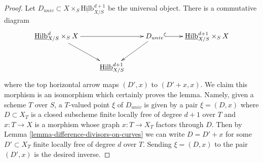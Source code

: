 \documentclass[10pt,a4paper]{amsart}
\theoremstyle{plain}
\theoremstyle{definition}
\theoremstyle{remark}
\numberwithin{equation}{subsection}
\def\Hilbfunctor{\mathrm{Hilb}}
\begin{document}
\begin{proof}
Let $D_{univ} \subset X \times_S \underline{\Hilbfunctor}^{d + 1}_{X/S}$
be the universal object. There is a commutative diagram
$$
\xymatrix{
\underline{\Hilbfunctor}^d_{X/S} \times_S X \ar[rr] \ar[rd] & &
D_{univ} \ar[ld] \ar@{^{(}->}[r] &
\underline{\Hilbfunctor}^{d + 1}_{X/S} \times_S X \\
& \underline{\Hilbfunctor}^{d + 1}_{X/S}
}
$$
where the top horizontal arrow maps $(D', x)$ to $(D' + x, x)$.
We claim this morphism is an isomorphism
which certainly proves the lemma. Namely, given a scheme $T$ over $S$,
a $T$-valued point $\xi$ of $D_{univ}$ is given by a pair $\xi = (D, x)$
where $D \subset X_T$ is a closed subscheme finite locally free
of degree $d + 1$ over $T$ and $x : T \to X$ is a morphism whose
graph $x : T \to X_T$ factors through $D$. Then by
Lemma \ref{lemma-difference-divisors-on-curves}
we can write $D = D' + x$ for some $D' \subset X_T$ finite locally
free of degree $d$ over $T$. Sending $\xi = (D, x)$ to the pair
$(D', x)$ is the desired inverse.
\end{proof}
\end{document}
